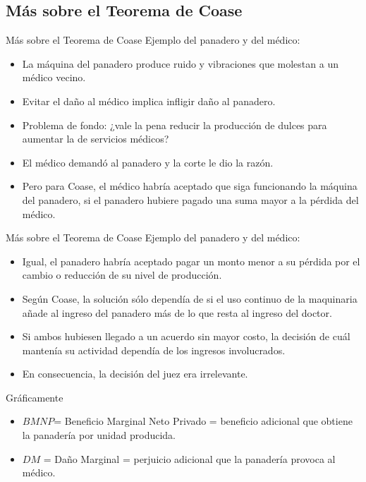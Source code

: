 \subsection{Más sobre el Teorema de Coase}
\begin{frame}{Más sobre el Teorema de Coase}
Ejemplo del panadero y del médico:
	\begin{itemize}
		\item La máquina del panadero produce ruido y vibraciones que molestan a un médico vecino.
		\item Evitar el daño al médico implica infligir daño al panadero.
		\item Problema de fondo: ¿vale la pena reducir la producción de dulces para aumentar la de servicios médicos?
		\item El médico demandó al panadero y la corte le dio la razón.
		\item Pero para Coase, el médico habría aceptado que siga funcionando la máquina del panadero, si el panadero hubiere pagado una suma mayor a la pérdida del médico.
	\end{itemize}	
\end{frame}
\begin{frame}{Más sobre el Teorema de Coase}
Ejemplo del panadero y del médico:
	\begin{itemize}
		\item Igual, el panadero habría aceptado pagar un monto menor a su pérdida por el cambio o reducción de su nivel de producción.
		\item Según Coase, la solución sólo dependía de si el uso continuo de la maquinaria añade al ingreso del panadero más de lo que resta al ingreso del doctor.
		\item Si ambos hubiesen llegado a un acuerdo sin mayor costo, la decisión de cuál mantenía su actividad dependía de los ingresos involucrados.
		\item En consecuencia, la decisión del juez era irrelevante.
	\end{itemize}
\end{frame}
\begin{frame}{Gráficamente}
	\begin{multicols}{2}
		\begin{itemize}
			\item $BMNP$= Beneficio Marginal Neto Privado = beneficio adicional que obtiene la panadería por unidad producida.
			\item $DM$ = Daño Marginal = perjuicio adicional que la panadería provoca al médico.
		\end{itemize}
		
		\begin{center}
			
		\end{center}
	\end{multicols}
\end{frame}

